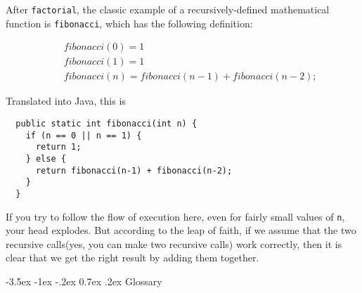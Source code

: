 \documentclass{book}
\makeatletter
\renewcommand{\section}{\@startsection 
    {section} {1} {0mm}%
    {-3.5ex \@plus -1ex \@minus -.2ex}%
    {0.7ex \@plus.2ex}%
    {\normalfont\Large\bfseries}}
\makeatother
\begin{document}
After {\tt factorial}, the classic example of a recursively-defined
mathematical function is {\tt fibonacci}, which has the
following definition:

\begin{eqnarray*}
&& fibonacci(0) = 1 \\
&& fibonacci(1) = 1 \\
&& fibonacci(n) = fibonacci(n-1) + fibonacci(n-2);
\end{eqnarray*}

Translated into Java, this is

\begin{verbatim}
  public static int fibonacci(int n) {
    if (n == 0 || n == 1) {
      return 1;
    } else {
      return fibonacci(n-1) + fibonacci(n-2);
    }
  }
\end{verbatim}
%
If you try to follow the flow of execution here, even for fairly small
values of {\tt n}, your head explodes.  But according to the leap of
faith, if we assume that the two recursive calls(yes, you can make
two recursive calls) work correctly, then it is clear that we get the
right result by adding them together.

\section{Glossary}
\end{document}
